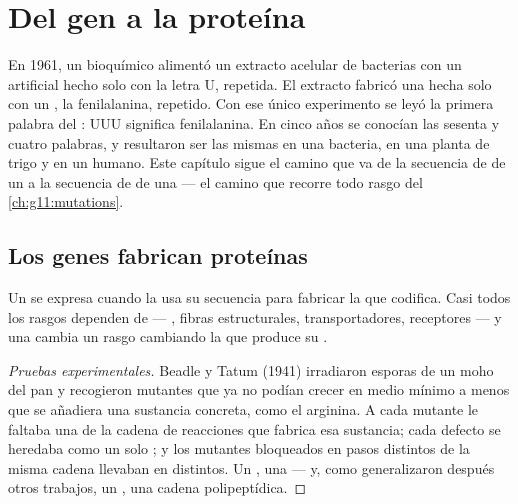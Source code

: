 \chapter{Del gen a la proteína}\label{ch:g11:gene-expression}

En 1961, un bioquímico alimentó un extracto acelular de bacterias con
un  artificial hecho solo con la letra U, repetida. El extracto
fabricó una  hecha solo con un , la fenilalanina,
repetido. Con ese único experimento se leyó la primera palabra del
: UUU significa fenilalanina. En cinco años se conocían
las sesenta y cuatro palabras, y resultaron ser las mismas en una
bacteria, en una planta de trigo y en un humano. Este capítulo sigue el
camino que va de la secuencia de  de un  a la secuencia
de  de una  --- el camino que recorre todo rasgo del
\cref{ch:g11:mutations}.

\section{Los genes fabrican proteínas}

\begin{proposition}\label{prop:g11:gene-expression:onegene}
Un  se expresa cuando la  usa su secuencia para fabricar la
 que codifica. Casi todos los rasgos dependen de  ---
, fibras estructurales, transportadores, receptores --- y una
 cambia un rasgo cambiando la  que produce su .
\end{proposition}
\begin{proof}[Pruebas experimentales]
Beadle y Tatum (1941) irradiaron esporas de un moho del pan y
recogieron mutantes que ya no podían crecer en medio mínimo a menos que
se añadiera una sustancia concreta, como el  arginina. A cada
mutante le faltaba una  de la cadena de reacciones que fabrica
esa sustancia; cada defecto se heredaba como un solo ; y los
mutantes bloqueados en pasos distintos de la misma cadena llevaban
 en  distintos. Un , una  --- y, como
generalizaron después otros trabajos, un , una cadena polipeptídica.
\end{proof}

